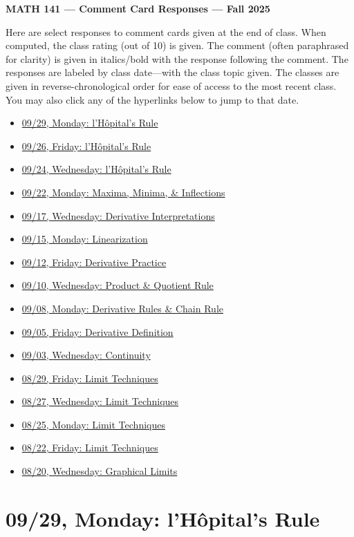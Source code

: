 \documentclass[11pt,letterpaper]{article}
\begin{document}
\begin{center} {\bfseries \LARGE MATH 141 --- Comment Card Responses --- Fall 2025} \end{center}

Here are select responses to comment cards given at the end of class. When computed, the class rating (out of 10) is given. The comment (often paraphrased for clarity) is given in italics/bold with the response following the comment. The responses are labeled by class date---with the class topic given. The classes are given in reverse-chronological order for ease of access to the most recent class. You may also click any of the hyperlinks below to jump to that date.

\begin{itemize}
\item \hyperref[09-29]{09/29, Monday: l'H\^{o}pital's Rule}
\item \hyperref[09-26]{09/26, Friday: l'H\^{o}pital's Rule}
\item \hyperref[09-24]{09/24, Wednesday: l'H\^{o}pital's Rule}
\item \hyperref[09-22]{09/22, Monday: Maxima, Minima, \& Inflections}
\item \hyperref[09-17]{09/17, Wednesday: Derivative Interpretations}
\item \hyperref[09-15]{09/15, Monday: Linearization}
\item \hyperref[09-12]{09/12,  Friday: Derivative Practice}
\item \hyperref[09-10]{09/10, Wednesday: Product \& Quotient Rule}
\item \hyperref[09-08]{09/08, Monday: Derivative Rules \& Chain Rule}
\item \hyperref[09-05]{09/05, Friday: Derivative Definition}
\item \hyperref[09-03]{09/03, Wednesday: Continuity}
\item \hyperref[08-29]{08/29, Friday: Limit Techniques}
\item \hyperref[08-27]{08/27, Wednesday: Limit Techniques}
\item \hyperref[08-25]{08/25, Monday: Limit Techniques}
\item \hyperref[08-22]{08/22, Friday: Limit Techniques}
\item \hyperref[08-20]{08/20, Wednesday: Graphical Limits}
\end{itemize}

\newpage
\section*{09/29, Monday: l'H\^{o}pital's Rule\label{09-29}}
\end{document}
